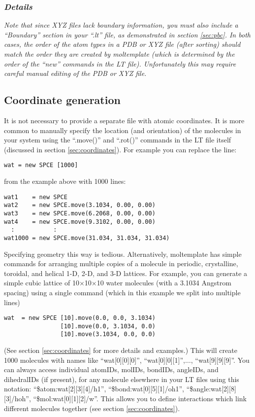 \documentclass[11pt]{article}
\begin{document}
\subsubsection*{\textit{Details}}
\textit{Note that since XYZ files lack boundary information, you must also 
 include a ``Boundary'' section in your ``.lt'' file, as demonstrated 
 in section \ref{sec:pbc}. 
 In both cases, the order of the atom types in a PDB or XYZ file 
 (after sorting) should match the order they are created by moltemplate
 (which is determined by the order of the ``new'' commands 
 in the LT file). 
 Unfortunately this may require careful manual editing of the PDB or XYZ file.}

\subsection{Coordinate generation}
\label{sec:coords_intro}
It is not necessary to provide a separate file with atomic coordinates. 
It is more common to manually specify the location 
(and orientation) of the molecules in your system using the
 ``.move()'' and ``.rot()'' commands %
in the LT file itself 
(discussed in section \ref{sec:coordinates}).
For example you can replace the line:
\begin{verbatim}
wat = new SPCE [1000]
\end{verbatim}
from the example above with 1000 lines:
\begin{verbatim}
wat1    = new SPCE
wat2    = new SPCE.move(3.1034, 0.00, 0.00)
wat3    = new SPCE.move(6.2068, 0.00, 0.00)
wat4    = new SPCE.move(9.3102, 0.00, 0.00)
  :           :
wat1000 = new SPCE.move(31.034, 31.034, 31.034)
\end{verbatim}
Specifying geometry this way is tedious.
Alternatively, moltemplate has simple commands for arranging multiple 
copies of a molecule in periodic, crystalline, toroidal, and helical 
1-D, 2-D, and 3-D lattices.  
For example, you can generate a simple cubic lattice of 
10$\times$10$\times$10 water molecules
(with a 3.1034 Angstrom spacing)
using a single command 
(which in this example we split into multiple lines)
\begin{verbatim}
wat  = new SPCE [10].move(0.0, 0.0, 3.1034) 
                [10].move(0.0, 3.1034, 0.0) 
                [10].move(3.1034, 0.0, 0.0)
\end{verbatim}
(See section \ref{sec:coordinates} for more details and examples.)
This will create 1000 molecules with names like
``wat[0][0][0]'', ``wat[0][0][1]'',$\ldots$, ``wat[9][9][9]''.
You can always access individual atomIDs, molIDs, bondIDs, angleIDs, 
and dihedralIDs (if present), for any molecule 
elsewhere in your LT files using this notation:
``\$atom:wat[2][3][4]/h1'', 
``\$bond:wat[0][5][1]/oh1'', 
``\$angle:wat[2][8][3]/hoh'', 
``\$mol:wat[0][1][2]/w''.
This allows you to define interactions which link
different molecules together (see section \ref{sec:coordinates}).
\end{document}
